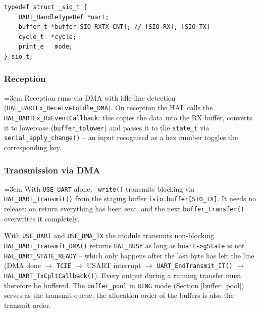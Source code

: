 \begin{listing}
\begin{verbatim}
typedef struct _sio_t {
    UART_HandleTypeDef *uart;
    buffer_t *buffer[SIO_RXTX_CNT]; // [SIO_RX], [SIO_TX]
    cycle_t  *cycle;
    print_e   mode;
} sio_t;
\end{verbatim}
\caption{Configuration structure \texttt{sio\_t}}
\label{sio_t}
\end{listing}

\subsubsection*{Reception}
{\sloppy\emergencystretch=3em
Reception runs via DMA with idle-line detection
(\verb|HAL_UARTEx_ReceiveToIdle_DMA|). On reception the HAL calls the
\verb|HAL_UARTEx_RxEventCallback|: this copies the data into the RX buffer,
converts it to lowercase (\verb|buffer_tolower|) and passes it to the
\verb|state_t| via \verb|serial_apply_change()| -- an input recognised as a hex
number toggles the corresponding key.
\par}

\subsubsection*{Transmission via DMA}\label{serial_dma_tx}
{\sloppy\emergencystretch=3em
With \verb|USE_UART| alone, \verb|_write()| transmits blocking via
\verb|HAL_UART_Transmit()| from the staging buffer \verb|isio.buffer[SIO_TX]|.
It needs no release: on return everything has been sent, and the next
\verb|buffer_transfer()| overwrites it completely.

With \verb|USE_UART| and \verb|USE_DMA_TX| the module transmits
non-blocking. \verb|HAL_UART_Transmit_DMA()| returns \verb|HAL_BUSY| as long
as \verb|huart->gState| is not \verb|HAL_UART_STATE_READY| -- which only
happens after the last byte has left the line (DMA done $\rightarrow$
\verb|TCIE| $\rightarrow$ USART interrupt $\rightarrow$
\verb|UART_EndTransmit_IT()| $\rightarrow$ \verb|HAL_UART_TxCpltCallback()|).
Every output during a running transfer must therefore be buffered. The
\verb|buffer_pool| in \verb|RING| mode (Section \ref{buffer_pool}) serves as
the transmit queue: the allocation order of the buffers is also the transmit
order.
\par}

